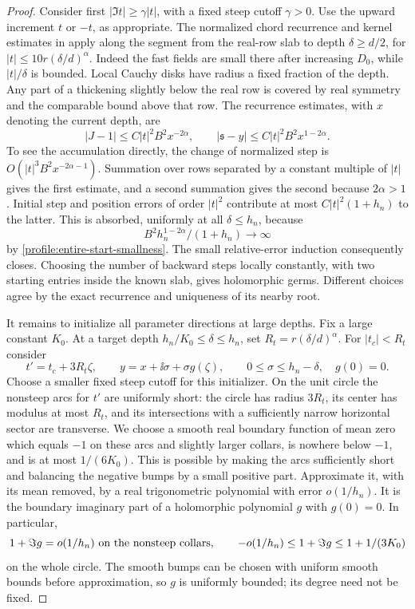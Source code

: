 \begin{proof}
Consider first \(|\Im t|\ge\gamma|t|\), with a fixed steep cutoff
\(\gamma>0\). Use the upward increment \(t\) or \(-t\), as
appropriate. The normalized chord recurrence and kernel estimates in
 apply along the segment from the real-row slab to depth
\(\delta\ge d/2\), for
\( |t|\le10r(\delta/d)^\alpha\). Indeed the fast fields are small
there after increasing \(D_0\), while \(|t|/\delta\) is bounded.
Local Cauchy disks have radius a fixed fraction of the depth. Any part
of a thickening slightly below the real row is covered by real
symmetry and the comparable bound above that row. The recurrence
estimates, with \(x\) denoting the current depth, are
\[
 |J-1|\le C|t|^2B^2x^{-2\alpha},\qquad
 |\mathfrak s-y|\le C|t|^2B^2x^{1-2\alpha}.
\]
To see the accumulation directly, the change of normalized step is
\(O(|t|^3B^2x^{-2\alpha-1})\). Summation over rows separated by a
constant multiple of \(|t|\) gives the first estimate, and a second
summation gives the second because \(2\alpha>1\). Initial step and
position errors of order \(|t|^2\) contribute at most
\(C|t|^2(1+h_n)\) to the latter. This is absorbed, uniformly at all
\(\delta\le h_n\), because
\[
 B^2h_n^{1-2\alpha}/(1+h_n)\longrightarrow\infty
\]
by \eqref{profile:entire-start-smallness}. The small relative-error
induction consequently closes. Choosing the number of backward steps
locally constantly, with two starting entries inside the known slab,
gives holomorphic germs. Different choices agree by the exact
recurrence and uniqueness of its nearby root.

It remains to initialize all parameter directions at large depths.
Fix a large constant \(K_0\). At a target depth
\(h_n/K_0\le\delta\le h_n\), set
\(R_t=r(\delta/d)^\alpha\). For \(|t_c|<R_t\) consider
\begin{equation}
 \label{profile:entire-initializer}
 t'=t_c+3R_t\zeta,\qquad
 y=x+\ii\sigma+\sigma g(\zeta),\qquad
 0\le\sigma\le h_n-\delta,
 \quad g(0)=0.
\end{equation}
Choose a smaller fixed steep cutoff for this initializer. On the unit
circle the nonsteep arcs for \(t'\) are uniformly short: the circle
has radius \(3R_t\), its center has modulus at most \(R_t\), and
its intersections with a sufficiently narrow horizontal sector are
transverse. We choose a smooth real boundary function of mean zero
which equals \(-1\) on these arcs and slightly larger collars, is
nowhere below \(-1\), and is at most \(1/(6K_0)\). This is possible
by making the arcs sufficiently short and balancing the negative
bumps by a small positive part. Approximate it, with its mean removed,
by a real trigonometric polynomial with error \(o(1/h_n)\). It is the
boundary imaginary part of a holomorphic polynomial \(g\) with
\(g(0)=0\). In particular,
\[
 1+\Im g=o(1/h_n)\ \hbox{on the nonsteep collars},\qquad
 -o(1/h_n)\le1+\Im g\le1+1/(3K_0)
\]
on the whole circle. The smooth bumps can be chosen with uniform
smooth bounds before approximation, so \(g\) is uniformly bounded;
its degree need not be fixed.


\end{proof}
